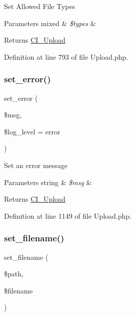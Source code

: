 Set Allowed File Types


\begin{DoxyParams}[1]{Parameters}
mixed & {\em \$types} & \\
\hline
\end{DoxyParams}
\begin{DoxyReturn}{Returns}
\mbox{\hyperlink{class_c_i___upload}{C\+I\+\_\+\+Upload}} 
\end{DoxyReturn}


Definition at line 793 of file Upload.\+php.

\mbox{\label{class_c_i___upload_aab6e33df2ad916fc21e93a84b6fd48bf}} 
\subsubsection{\texorpdfstring{set\_error()}{set\_error()}}
{\footnotesize\ttfamily set\+\_\+error (\begin{DoxyParamCaption}\item[{}]{\$msg,  }\item[{}]{\$log\+\_\+level = {\ttfamily \textquotesingle{}error\textquotesingle{}} }\end{DoxyParamCaption})}

Set an error message


\begin{DoxyParams}[1]{Parameters}
string & {\em \$msg} & \\
\hline
\end{DoxyParams}
\begin{DoxyReturn}{Returns}
\mbox{\hyperlink{class_c_i___upload}{C\+I\+\_\+\+Upload}} 
\end{DoxyReturn}


Definition at line 1149 of file Upload.\+php.

\mbox{\label{class_c_i___upload_a4b09b3f2b57a8bafcac1700f43d12c36}} 
\subsubsection{\texorpdfstring{set\_filename()}{set\_filename()}}
{\footnotesize\ttfamily set\+\_\+filename (\begin{DoxyParamCaption}\item[{}]{\$path,  }\item[{}]{\$filename }\end{DoxyParamCaption})}

